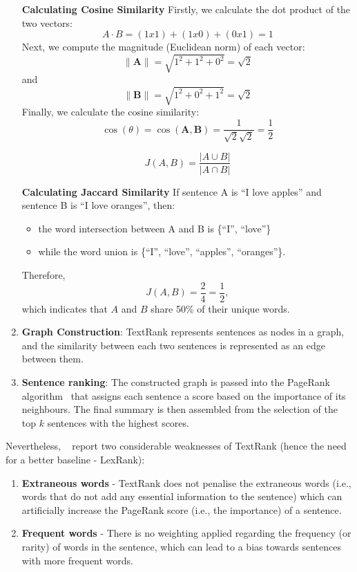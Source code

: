 \begin{enumerate}
\begin{beaux_exemples}{\textbf{Calculating Cosine Similarity}}
            Firstly, we calculate the dot product of the two vectors:
            \[
                A \cdot B = (1x1) + (1x0) + (0x1) = 1
            \]
            Next, we compute the magnitude (Euclidean norm) of each vector:
            \[
                \|\mathbf{A}\| = \sqrt{1^2 + 1^2 + 0^2} = \sqrt{2}
            \]
            and
            \[
                \|\mathbf{B}\| = \sqrt{1^2 + 0^2 + 1^2} = \sqrt{2}
            \]
            Finally, we calculate the cosine similarity:
            \[
                \cos(\theta) = \cos(\mathbf{A},\mathbf{B}) = \frac{1}{\sqrt{2} \sqrt{2}} = \frac{1}{2}
            \]
        \end{beaux_exemples}
        \begin{equation}\label{eq:jaccard_similarity}
            J(A,B)= \frac{|A\cup B|}{|A\cap B|}
        \end{equation}
        \begin{beaux_exemples}{\textbf{Calculating Jaccard Similarity}}\label{ex:jaccard}
            If sentence A is ``I love apples'' and sentence B is ``I love oranges'', then:
            \begin{itemize}
                \item the word intersection between A and B is \{``I'', ``love''\}
                \item while the word union is \{``I'', ``love'', ``apples'', ``oranges''\}.
            \end{itemize}
            Therefore,
            \[
                J(A,B)=\frac{2}{4}=\frac{1}{2},
            \]
            which indicates that $A$ and $B$ share 50\% of their unique words.
        \end{beaux_exemples}
    \item \textbf{Graph Construction}: TextRank represents sentences as nodes in a graph, and the similarity between each two sentences is represented as an edge between them.
    \item \textbf{Sentence ranking}: The constructed graph is passed into the PageRank algorithm~\cite{page1998anatomy} that assigns each sentence a score based on the importance of its neighbours.
    The final summary is then assembled from the selection of the top $k$ sentences with the highest scores.
\end{enumerate}
Nevertheless, ~\cite{Shearing2020AutomatedTS} report two considerable weaknesses of TextRank (hence the need for a better baseline - LexRank):
\begin{enumerate}
    \item \textbf{Extraneous words} - TextRank does not penalise the extraneous words (i.e., words that do not add any essential information to the sentence) which can artificially increase the PageRank score (i.e., the importance) of a sentence.
    \item \textbf{Frequent words} - There is no weighting applied regarding the frequency (or rarity) of words in the sentence, which can lead to a bias towards sentences with more frequent words.
\end{enumerate}
